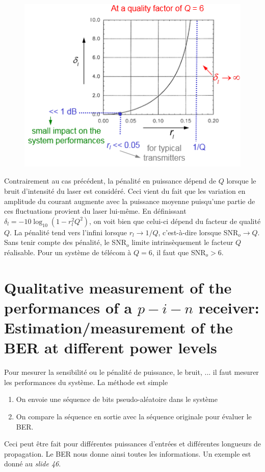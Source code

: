 \begin{figure}
\vspace{-5mm}
\includegraphics[scale=0.5]{ch5/image21}
\end{figure}
Contrairement au cas précédent, la pénalité en puissance dépend de $Q$ lorsque le bruit d'intensité 
du laser est considéré. Ceci vient du fait que les variation en amplitude du courant augmente 
avec la puissance moyenne puisqu'une partie de ces fluctuations provient du laser lui-même. En 
définissant ${\delta _l} =  - 10{\log _{10}}\left( {1 - r_l^2{Q^2}} \right)$, on voit bien que
celui-ci dépend du facteur de qualité $Q$. La pénalité tend vers l'infini lorsque $r_l\to 1/Q$, 
c'est-à-dire lorsque SNR$_o\to Q$. Sans tenir compte des pénalité, le SNR$_o$ limite intrinsèquement
le facteur $Q$ réalisable. Pour un système de télécom à $Q=6$, il faut que SNR$_o>6$.

\newpage
\section{Qualitative measurement of the performances of a $p-i-n$ receiver: Estimation/measurement of the BER at different power levels }
Pour mesurer la sensibilité ou le pénalité de puissance, le bruit, ... il faut mesurer les 
performances du système.  La méthode est simple
\begin{enumerate}
\item On envoie une séquence de bits pseudo-aléatoire dans le système
\item On compare la séquence en sortie avec la séquence originale pour évaluer le BER.
\end{enumerate}
Ceci peut être fait pour différentes puissances d'entrées et différentes longueurs de propagation. 
Le BER nous donne ainsi toutes les informations. Un exemple est donné au \textit{slide 46}.
